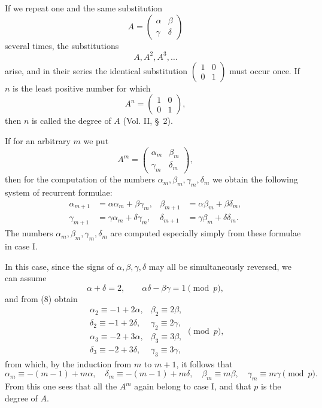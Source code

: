\documentclass[11pt]{article}
\begin{document}
If we repeat one and the same substitution
\begin{equation}
 A=\begin{pmatrix}\alpha&\beta\\ \gamma&\delta\end{pmatrix}
\tag{7}
\end{equation}
several times, the substitutions
\[
 A,A^2,A^3,\ldots
\]
arise, and in their series the identical substitution $\begin{pmatrix}1&0\\0&1\end{pmatrix}$ must occur once. If $n$ is the least positive number for which
\[
 A^n=\begin{pmatrix}1&0\\0&1\end{pmatrix},
\]
then $n$ is called the degree of $A$ (Vol. II, \S~2).

If for an arbitrary $m$ we put
\[
 A^m=\begin{pmatrix}\alpha_m&\beta_m\\\gamma_m&\delta_m\end{pmatrix},
\]
then for the computation of the numbers $\alpha_m,\beta_m,\gamma_m,\delta_m$ we obtain the following system of recurrent formulae:
\begin{equation}
\begin{aligned}
 \alpha_{m+1}&=\alpha\alpha_m+\beta\gamma_m,&
 \beta_{m+1}&=\alpha\beta_m+\beta\delta_m,\\
 \gamma_{m+1}&=\gamma\alpha_m+\delta\gamma_m,&
 \delta_{m+1}&=\gamma\beta_m+\delta\delta_m.
\end{aligned}
\tag{8}
\end{equation}
The numbers $\alpha_m,\beta_m,\gamma_m,\delta_m$ are computed especially simply from these formulae in case I.

In this case, since the signs of $\alpha,\beta,\gamma,\delta$ may all be simultaneously reversed, we can assume
\[
 \alpha+
\delta=2,
 \qquad \alpha\delta-\beta\gamma=1\pmod p,
\]
and from (8) obtain
\[
\begin{array}{ll}
\alpha_2\equiv -1+2\alpha,&\beta_2\equiv2\beta,\\
\delta_2\equiv -1+2\delta,&\gamma_2\equiv2\gamma,\\
\alpha_3\equiv -2+3\alpha,&\beta_3\equiv3\beta,\\
\delta_3\equiv -2+3\delta,&\gamma_3\equiv3\gamma,
\end{array}\pmod p,
\]
from which, by the induction from $m$ to $m+1$, it follows that
\begin{equation}
 \alpha_m\equiv-(m-1)+m\alpha,
 \quad \delta_m\equiv-(m-1)+m\delta,
 \quad \beta_m\equiv m\beta,
 \quad \gamma_m\equiv m\gamma\pmod p.
\tag{9}
\end{equation}
From this one sees that all the $A^m$ again belong to case I, and that $p$ is the degree of $A$.
\end{document}
